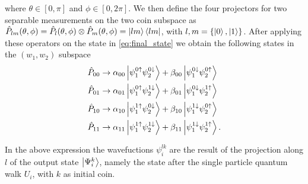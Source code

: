 \documentclass[
	aps, pra, authorblock, superscriptaddress, twocolumn,
	10pt
]{revtex4-1}
\begin{document}
\noindent
where $\theta \in [0, \pi ]$ and $\phi \in [0, 2\pi]$. We then define the four projectors for two separable measurements on the two coin subspace as $\hat{P}_{lm}(\theta, \phi)= \hat{P}_{l}(\theta, \phi)\otimes \hat{P}_{m}(\theta, \phi) = \ket{lm}\bra{lm}$, with $l,m = \{\ket{0}, \ket{1}\}$. After applying these operators on the state in \cref{eq:final_state} we obtain the following states in the $(w_1, w_2)$ subspace
\begin{subequations}
\label{eq:prj_state}
\begin{align}
    \hat{P}_{00} &\rightarrow \alpha_{00}\ket{\psi^{0 \uparrow}_1 \psi^{0 \downarrow}_2} + \beta_{00}\ket{\psi^{0 \downarrow}_1 \psi^{0 \uparrow}_2} \label{eq:prj_state_a}\\
    \hat{P}_{01} &\rightarrow \alpha_{01}\ket{\psi^{0 \uparrow}_1 \psi^{1 \downarrow}_2} + \beta_{01}\ket{\psi^{0 \downarrow}_1 \psi^{1 \uparrow}_2}\label{eq:prj_state_b}\\
    \hat{P}_{10} &\rightarrow \alpha_{10}\ket{\psi^{1 \uparrow}_1 \psi^{0 \downarrow}_2} + \beta_{10}\ket{\psi^{1 \downarrow}_1 \psi^{0 \uparrow}_2}\label{eq:prj_state_c}\\
     \hat{P}_{11} &\rightarrow \alpha_{11}\ket{\psi^{1 \uparrow}_1 \psi^{1 \downarrow}_2} + \beta_{11}\ket{\psi^{1 \downarrow}_1 \psi^{1 \uparrow}_2}\label{eq:prj_state_d}.
\end{align}
\end{subequations}

In the above expression the wavefuctions $\psi^{lk}_i$ are the result of the projection along $l$ of the output state $\ket{\Psi^{k}_i}$, namely the state after the single particle quantum walk $U_i$, with $k$ as initial coin.
\end{document}
